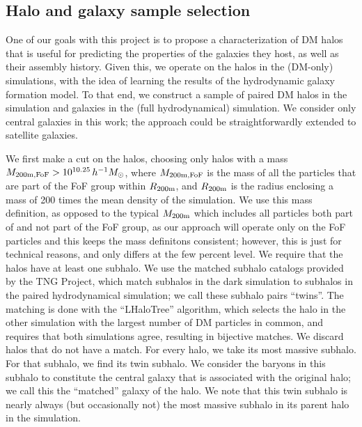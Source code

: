 \subsection{Halo and galaxy sample selection}
\label{sec:select}

One of our goals with this project is to propose a characterization of DM halos that is useful for predicting the properties of the galaxies they host, as well as their assembly history.
Given this, we operate on the halos in the \dark (DM-only) simulations, with the idea of learning the results of the hydrodynamic galaxy formation model.
To that end, we construct a sample of paired DM halos in the \dark simulation and galaxies in the \hydro (full hydrodynamical) simulation. 
We consider only central galaxies in this work; the approach could be straightforwardly extended to satellite galaxies.

We first make a cut on the \dark halos, choosing only halos with a mass $M_\mathrm{200m,FoF} > 10^{10.25} \, h^{-1} M_\mathrm{\odot}$, where $M_\mathrm{200m,FoF}$ is the mass of all the particles that are part of the FoF group within $R_\mathrm{200m}$, and $R_\mathrm{200m}$ is the radius enclosing a mass of 200 times the mean density of the simulation.
We use this mass definition, as opposed to the typical $M_\mathrm{200m}$ which includes all particles both part of and not part of the FoF group, as our approach will operate only on the FoF particles and this keeps the mass definitons consistent; however, this is just for technical reasons, and only differs at the few percent level.
We require that the halos have at least one subhalo.
We use the matched subhalo catalogs provided by the TNG Project, which match subhalos in the dark simulation to subhalos in the paired hydrodynamical simulation; we call these subhalo pairs ``twins''.
The matching is done with the ``LHaloTree'' algorithm, which selects the halo in the other simulation with the largest number of DM particles in common, and requires that both simulations agree, resulting in bijective matches.
We discard halos that do not have a \hydro match.
For every \dark halo, we take its most massive \dark subhalo.
For that \dark subhalo, we find its twin \hydro subhalo.
We consider the baryons in this subhalo to constitute the central galaxy that is associated with the original \dark halo; we call this the ``matched'' galaxy of the \dark halo. 
We note that this twin \hydro subhalo is nearly always (but occasionally not) the most massive subhalo in its parent halo in the \hydro simulation.

